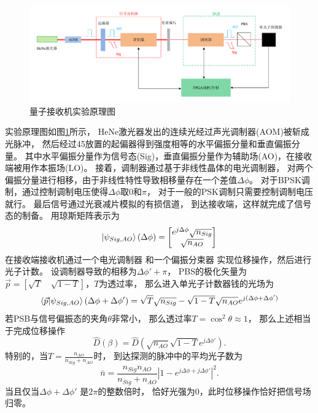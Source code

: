 \begin{figure}
\centering
  \includegraphics[width=\textwidth]{figures/chap5/experiment-schematic}
  \caption{量子接收机实验原理图}
  \label{fig:experiment-schematic}
\end{figure}



实验原理图如图\ref{fig:experiment-schematic}所示，
HeNe激光器发出的连续光经过声光调制器(AOM)被斩成光脉冲，
然后经过45\deg 放置的起偏器得到强度相等的水平偏振分量和垂直偏振分量。
其中水平偏振分量作为信号态(Sig)，垂直偏振分量作为辅助场(AO)，在接收端被用作本振场(LO)。
接着，调制器通过基于非线性晶体的电光调制器，
对两个偏振分量进行相移，由于非线性特性导致相移量存在一个差值$\Delta \phi$。
对于BPSK调制，通过控制调制电压使得$\Delta \phi$取$0$和$\pi$，
对于一般的PSK调制只需要控制调制电压就行。
最后信号通过光衰减片模拟的有损信道，
到达接收端，这样就完成了信号态的制备。
用琼斯矩阵表示为
\begin{equation}
\ket{\psi_{Sig, AO}}(\Delta \phi) = \begin{bmatrix}
                            e^{j \Delta \phi}\sqrt{n_{Sig}} \\
                            \sqrt{n_{AO}} 
                        \end{bmatrix}
\end{equation}
在接收端接收机通过一个电光调制器
和一个偏振分束器
实现位移操作，然后进行光子计数。
设调制器导致的相移为$\Delta \phi' + \pi$，
PBS的极化矢量为$\vec{p} = [\sqrt{T} \quad \sqrt{1-T}]$，$T$为透过率，
那么进入单光子计数器钱的光场为
\begin{equation}
\bra{\vec{p}} \ket{\psi_{Sig, AO}}(\Delta \phi + \Delta \phi') \\
             =  \sqrt{T}\sqrt{n_{Sig}} - \sqrt{1-T}\sqrt{n_{AO}} e^{j(\Delta \phi + \Delta \phi')} 
\end{equation}
若PSB与信号偏振态的夹角$\theta$非常小，
那么透过率$T = \cos^2 \theta \approx 1$，
那么上述相当于完成位移操作
\begin{equation}
\hat{D}(\beta) = \hat{D}(\sqrt{n_{AO}}\sqrt{1-T} e^{j \Delta\phi'}).
\end{equation}
特别的，当$T = \frac{n_{AO}}{n_{Sig} + n_{AO}}$时，
到达探测的脉冲中的平均光子数为
\begin{equation}
\bar{n} = \frac{n_{Sig} n_{AO}}{n_{Sig} + n_{AO}} \left|1 - e^{j\Delta \phi + j \Delta \phi'} \right|^2.
\end{equation}
当且仅当$\Delta \phi + \Delta \phi'$ 是$2\pi$的整数倍时，
恰好光强为0，此时位移操作恰好把信号场归零。

